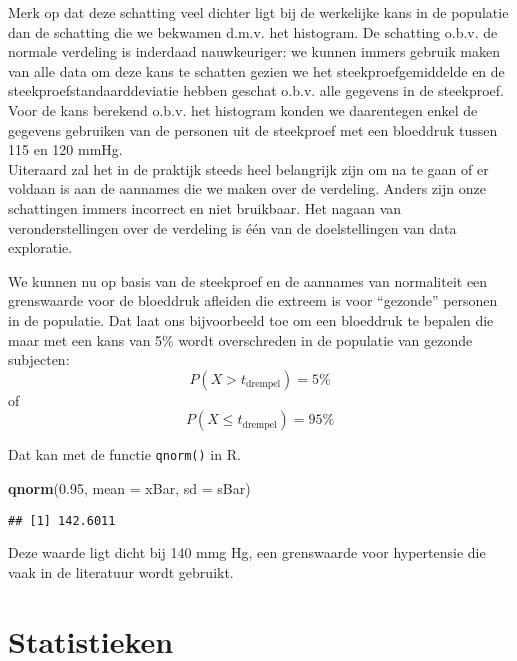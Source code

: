 \documentclass[12pt,dutch,coursenotes]{book}
\newenvironment{Shaded}{\begin{snugshade}}{\end{snugshade}}
\newcommand{\KeywordTok}[1]{\textcolor[rgb]{0.13,0.29,0.53}{\textbf{#1}}}
\newcommand{\DataTypeTok}[1]{\textcolor[rgb]{0.13,0.29,0.53}{#1}}
\newcommand{\FloatTok}[1]{\textcolor[rgb]{0.00,0.00,0.81}{#1}}
\newcommand{\NormalTok}[1]{#1}
\theoremstyle{definition}
\theoremstyle{definition}
\theoremstyle{definition}
\theoremstyle{remark}
\begin{document}
Merk op dat deze schatting veel dichter ligt bij de werkelijke kans in
de populatie dan de schatting die we bekwamen d.m.v. het histogram. De
schatting o.b.v. de normale verdeling is inderdaad nauwkeuriger: we
kunnen immers gebruik maken van alle data om deze kans te schatten
gezien we het steekproefgemiddelde en de steekproefstandaarddeviatie
hebben geschat o.b.v. alle gegevens in de steekproef. Voor de kans
berekend o.b.v. het histogram konden we daarentegen enkel de gegevens
gebruiken van de personen uit de steekproef met een bloeddruk tussen 115
en 120 mmHg.\\
Uiteraard zal het in de praktijk steeds heel belangrijk zijn om na te
gaan of er voldaan is aan de aannames die we maken over de verdeling.
Anders zijn onze schattingen immers incorrect en niet bruikbaar. Het
nagaan van veronderstellingen over de verdeling is één van de
doelstellingen van data exploratie.

We kunnen nu op basis van de steekproef en de aannames van normaliteit
een grenswaarde voor de bloeddruk afleiden die extreem is voor
``gezonde'' personen in de populatie. Dat laat ons bijvoorbeeld toe om
een bloeddruk te bepalen die maar met een kans van 5\% wordt
overschreden in de populatie van gezonde subjecten:
\[P(X > t_\text{drempel}) = 5\%\] of
\[P(X \leq t_\text{drempel}) = 95\%\]

Dat kan met de functie \texttt{qnorm()} in R.

\begin{Shaded}
\begin{Highlighting}[]
\KeywordTok{qnorm}\NormalTok{(}\FloatTok{0.95}\NormalTok{, }\DataTypeTok{mean =}\NormalTok{ xBar, }\DataTypeTok{sd =}\NormalTok{ sBar)}
\end{Highlighting}
\end{Shaded}

\begin{verbatim}
## [1] 142.6011
\end{verbatim}

Deze waarde ligt dicht bij 140 mmg Hg, een grenswaarde voor hypertensie
die vaak in de literatuur wordt gebruikt.

\section{Statistieken}\label{statistieken}
\end{document}
